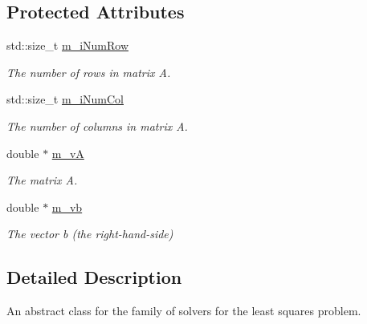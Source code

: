 \subsection*{Protected Attributes}
\begin{DoxyCompactItemize}
\item 
\hypertarget{classLSSolver_accba7e985f2f74ec9581f1e1ad185b75}{std\-::size\-\_\-t \hyperlink{classLSSolver_accba7e985f2f74ec9581f1e1ad185b75}{m\-\_\-i\-Num\-Row}}\label{classLSSolver_accba7e985f2f74ec9581f1e1ad185b75}

\begin{DoxyCompactList}\small\item\em The number of rows in matrix A. \end{DoxyCompactList}\item 
\hypertarget{classLSSolver_ad6c84ba57573c4a0834423489abc6775}{std\-::size\-\_\-t \hyperlink{classLSSolver_ad6c84ba57573c4a0834423489abc6775}{m\-\_\-i\-Num\-Col}}\label{classLSSolver_ad6c84ba57573c4a0834423489abc6775}

\begin{DoxyCompactList}\small\item\em The number of columns in matrix A. \end{DoxyCompactList}\item 
\hypertarget{classLSSolver_a4e0d7d2d24bd961999f205c37734ea5c}{double $\ast$ \hyperlink{classLSSolver_a4e0d7d2d24bd961999f205c37734ea5c}{m\-\_\-v\-A}}\label{classLSSolver_a4e0d7d2d24bd961999f205c37734ea5c}

\begin{DoxyCompactList}\small\item\em The matrix A. \end{DoxyCompactList}\item 
\hypertarget{classLSSolver_a68d9e90d326f9a50713ff37a0ffe1683}{double $\ast$ \hyperlink{classLSSolver_a68d9e90d326f9a50713ff37a0ffe1683}{m\-\_\-vb}}\label{classLSSolver_a68d9e90d326f9a50713ff37a0ffe1683}

\begin{DoxyCompactList}\small\item\em The vector b (the right-\/hand-\/side) \end{DoxyCompactList}\end{DoxyCompactItemize}


\subsection{Detailed Description}
An abstract class for the family of solvers for the least squares problem. 


